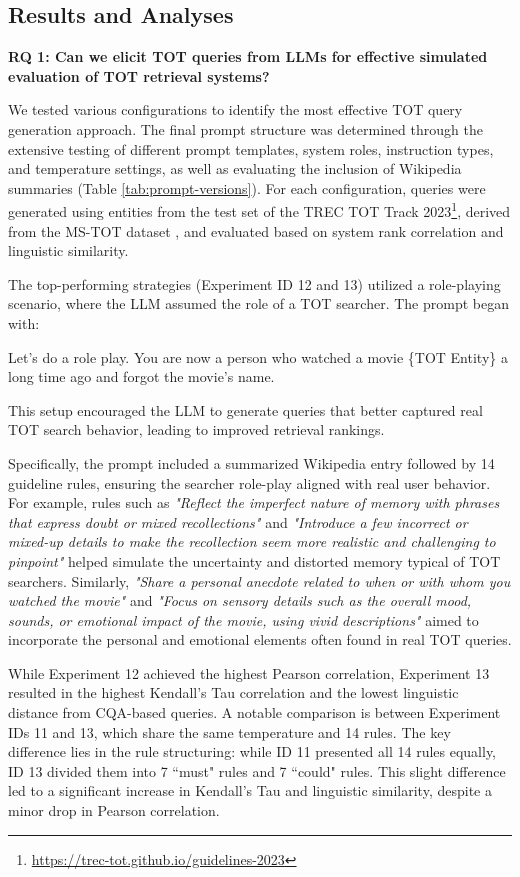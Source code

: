 \subsection{Results and Analyses}
\textbf{RQ 1: Can we elicit TOT queries from LLMs for effective simulated evaluation of TOT retrieval systems?}

We tested various configurations to identify the most effective TOT query generation approach. The final prompt structure was determined through the extensive testing of different prompt templates, system roles, instruction types, and temperature settings, as well as evaluating the inclusion of Wikipedia summaries (Table \ref{tab:prompt-versions}). 
For each configuration, queries were generated using entities from the test set of the TREC TOT Track 2023\footnote{\url{https://trec-tot.github.io/guidelines-2023}}, derived from the MS-TOT dataset \cite{arguello-movie-identification}, and evaluated based on system rank correlation and linguistic similarity.


The top-performing strategies (Experiment ID 12 and 13) utilized a role-playing scenario, where the LLM assumed the role of a TOT searcher. The prompt began with:
\begin{tcolorbox}
Let's do a role play. You are now a person who watched a movie \{TOT Entity\} a long time ago and forgot the movie's name. 
\end{tcolorbox}
\noindent
This setup encouraged the LLM to generate queries that better captured real TOT search behavior, leading to improved retrieval rankings.

Specifically, the prompt included a summarized Wikipedia entry followed by 14 guideline rules, ensuring the searcher role-play aligned with real user behavior. 
For example, rules such as \textit{"Reflect the imperfect nature of memory with phrases that express doubt or mixed recollections"} and \textit{"Introduce a few incorrect or mixed-up details to make the recollection seem more realistic and challenging to pinpoint"} helped simulate the uncertainty and distorted memory typical of TOT searchers.
Similarly, \textit{"Share a personal anecdote related to when or with whom you watched the movie"} and \textit{"Focus on sensory details such as the overall mood, sounds, or emotional impact of the movie, using vivid descriptions"} aimed to incorporate the personal and emotional elements often found in real TOT queries.

While Experiment 12 achieved the highest Pearson correlation, Experiment 13 
resulted in the highest Kendall’s Tau correlation and the lowest linguistic distance from CQA-based queries.
%
A notable comparison is between Experiment IDs 11 and 13, which share the same temperature and 14 rules. The key difference lies in the rule structuring: while ID 11 presented all 14 rules equally, ID 13 divided them into 7 ``must" rules and 7 ``could" rules. This slight difference led to a significant increase in Kendall’s Tau and linguistic similarity, despite a minor drop in Pearson correlation. 


